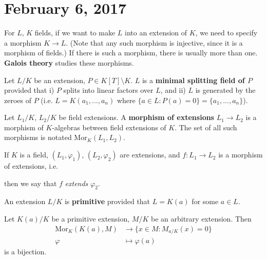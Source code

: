 \section{February 6, 2017}

\begin{rmk}
For $L$, $K$ fields, if we want to make $L$ into an extension of $K$, we need to specify a morphism $K \rightarrow L$. (Note that any such morphism is injective, since it is a morphism of fields.) If there is such a morphism, there is usually more than one. \textbf{Galois theory} studies these morphisms.
\end{rmk}

\begin{defn}
Let $L/K$ be an extension, $P \in K[T] \setminus K$. $L$ is a \textbf{minimal splitting field of $P$} provided that i) $P$ splits into linear factors over $L$, and ii) $L$ is generated by the zeroes of $P$ (i.e. $L = K(a_1, ..., a_n)$ where $\{a \in L \colon P(a) = 0\} = \{a_1, ..., a_n\}$).
\end{defn}

\begin{defn}
Let $L_1/K$, $L_2/K$ be field extensions. A \textbf{morphism of extensions} $L_1 \rightarrow L_2$ is a morphism of $K$-algebras between field extensions of $K$. The set of all such morphisms is notated Mor$_K(L_1, L_2)$.
\end{defn}

\begin{rmk}
If $K$ is a field, $(L_1, \varphi_1)$, $(L_2, \varphi_2)$ are extensions, and $f \colon L_1 \rightarrow L_2$ is a morphism of extensions, i.e.
\begin{center}
\end{center}
then we say that $f$ \textit{extends} $\varphi_2$.
\end{rmk}

\begin{defn}
An extension $L/K$ is \textbf{primitive} provided that $L = K(a)$ for some $a \in L$.
\end{defn}

\begin{prop}
Let $K(a)/K$ be a primitive extension, $M/K$ be an arbitrary extension. Then
\begin{align*}
\text{Mor}_K(K(a), M) &\rightarrow \{x \in M \colon M_{a/K}(x) = 0\} \\
\varphi &\mapsto \varphi(a)
\end{align*}
is a bijection.
\end{prop}

